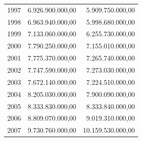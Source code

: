 \documentclass[a4paper,openright,12pt]{book}
\begin{document}
\begin{table}[]
\begin{tabular}{@{}lrr@{}}
1997 & 6.926.900.000,00                                                                                                      & 5.909.750.000,00                                                                                                      \\
1998 & 6.963.940.000,00                                                                                                      & 5.998.680.000,00                                                                                                      \\
1999 & 7.133.060.000,00                                                                                                      & 6.255.730.000,00                                                                                                      \\
2000 & 7.790.250.000,00                                                                                                      & 7.155.010.000,00                                                                                                      \\
2001 & 7.775.370.000,00                                                                                                      & 7.265.740.000,00                                                                                                      \\
2002 & 7.747.590.000,00                                                                                                      & 7.273.030.000,00                                                                                                      \\
2003 & 7.672.140.000,00                                                                                                      & 7.224.510.000,00                                                                                                      \\
2004 & 8.205.030.000,00                                                                                                      & 7.900.090.000,00                                                                                                      \\
2005 & 8.333.830.000,00                                                                                                      & 8.333.840.000,00                                                                                                      \\
2006 & 8.809.070.000,00                                                                                                      & 9.019.310.000,00                                                                                                      \\
2007 & 9.730.760.000,00                                                                                                      & 10.159.530.000,00                                                                                                     \\ \bottomrule
\end{tabular}
\end{table}
\end{document}

